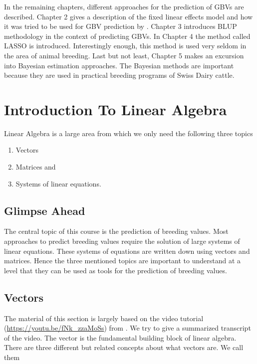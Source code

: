 \documentclass[
]{book}
\providecommand{\tightlist}{%
  \setlength{\itemsep}{0pt}\setlength{\parskip}{0pt}}
\theoremstyle{definition}
\theoremstyle{definition}
\theoremstyle{definition}
\theoremstyle{remark}
\begin{document}
In the remaining chapters, different approaches for the prediction of GBVs are described. Chapter 2 gives a description of the fixed linear effects model and how it was tried to be used for GBV prediction by \citep{Meuwissen2001}. Chapter 3 introduces BLUP methodology in the context of predicting GBVs. In Chapter 4 the method called LASSO is introduced. Interestingly enough, this method is used very seldom in the area of animal breeding. Last but not least, Chapter 5 makes an excursion into Bayesian estimation approaches. The Bayesian methods are important because they are used in practical breeding programs of Swiss Dairy cattle.

\appendix

\hypertarget{intro-linalg}{%
\chapter{Introduction To Linear Algebra}\label{intro-linalg}}

Linear Algebra is a large area from which we only need the following three topics

\begin{enumerate}
\def\labelenumi{\arabic{enumi}.}
\tightlist
\item
  Vectors
\item
  Matrices and
\item
  Systems of linear equations.
\end{enumerate}

\hypertarget{intro-linalg-glimpse-ahead}{%
\section{Glimpse Ahead}\label{intro-linalg-glimpse-ahead}}

The central topic of this course is the prediction of breeding values. Most approaches to predict breeding values require the solution of large systems of linear equations. These systems of equations are written down using vectors and matrices. Hence the three mentioned topics are important to understand at a level that they can be used as tools for the prediction of breeding values.

\hypertarget{intro-linalg-vectors}{%
\section{Vectors}\label{intro-linalg-vectors}}

The material of this section is largely based on the video tutorial (\url{https://youtu.be/fNk_zzaMoSs}) from \citep{3blue1brown2016}. We try to give a summarized transcript of the video. The vector is the fundamental building block of linear algebra. There are three different but related concepts about what vectors are. We call them
\end{document}
